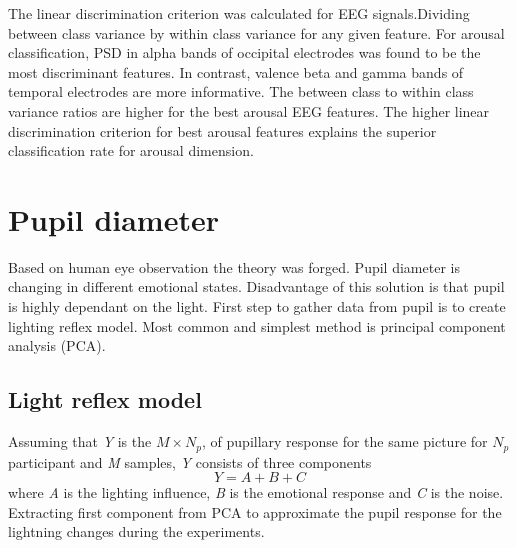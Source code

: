 \documentclass[10pt,journal,compsoc,twoside]{IEEEtran}
\begin{document}
The linear discrimination criterion was calculated for EEG signals.Dividing between class variance by within class variance for any given feature.
For arousal classification, PSD in alpha bands of occipital electrodes was found to be the most discriminant features. In contrast, valence beta and gamma bands of temporal electrodes are more informative. The between class to within class variance ratios are higher for the best arousal EEG features. The higher linear discrimination criterion for best arousal features explains the superior classification rate for arousal dimension.



\section{Pupil diameter}
Based on human eye observation the theory was forged. Pupil diameter is changing in different emotional states. Disadvantage of this solution is that pupil is highly dependant on the light. First step to gather data from pupil is to create lighting reflex model. Most common and simplest method is principal component analysis (PCA).
\subsection{Light reflex model}
Assuming that \textit{Y} is the $M \times N_{p}$, of pupillary response for the same picture for \textit{$N_{p}$} participant and \textit{M} samples, \textit{Y} consists of three components
\begin{equation}
Y = A + B + C
\end{equation}
where \textit{A} is the lighting influence, \textit{B} is the emotional response and \textit{C} is the noise. Extracting first component from PCA to approximate the pupil response for the lightning changes during the experiments.
\end{document}
